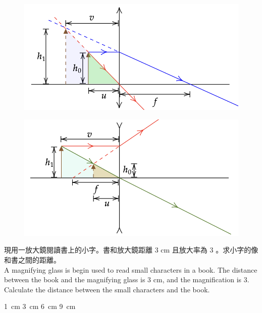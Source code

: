 \documentclass[beamer=true]{standalone}
\begin{document}
\begin{frame}{}
    \begin{figure}
        \centering
        \includegraphics[width=0.7\linewidth]{../../assets/c82nu9238d.png}
    \end{figure}
    \begin{figure}
        \centering
        \includegraphics[width=0.7\linewidth]{../../assets/wedcnu89u34.png}
    \end{figure}
\end{frame}

\begin{eg}
    現用一放大鏡閱讀書上的小字。書和放大鏡距離 3 cm 且放大率為 3 。求小字的像和書之間的距離。\\
    A magnifying glass is begin used to read small characters in a book. The distance between the book and the magnifying glass is 3 cm, and the magnification is 3. Calculate the distance between the small characters and the book.
    \begin{tasks}
        \task \qty{1}{cm}
        \task \qty{3}{cm}
        \task \qty{6}{cm}
        \task \qty{9}{cm}
    \end{tasks}
\end{eg}
\end{document}
